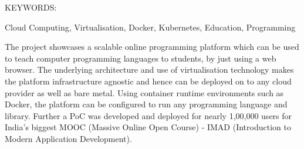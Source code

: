 \documentclass[DD]{iitmdiss}
\begin{document}




\abstract

\noindent KEYWORDS: \hspace*{0.5em} \parbox[t]{4.4in}{Cloud Computing, Virtualisation, Docker, Kubernetes, Education, Programming}

\vspace*{24pt}

\noindent The project showcases a scalable online programming platform which can be used to teach computer programming languages to students, by just using a web browser. The underlying architecture and use of virtualisation technology makes the platform infrastructure agnostic and hence can be deployed on to any cloud provider as well as bare metal. Using container runtime environments such as Docker, the platform can be configured to run any programming language and library. Further a PoC was developed and deployed for nearly 1,00,000 users for India's biggest MOOC (Massive Online Open Course) - IMAD (Introduction to Modern Application Development).

\pagebreak


\begin{singlespace}
\tableofcontents
\thispagestyle{empty}

\listoftables
{}
\listoffigures
{}
\end{singlespace}


\abbreviations
\end{document}
